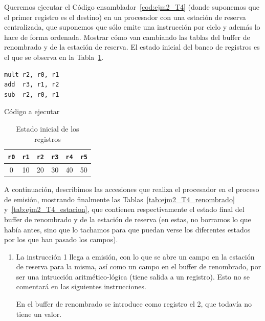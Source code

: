 \begin{ejemplo}
    Queremos ejecutar el Código ensamblador~\ref{cod:ejm2_T4} (donde suponemos que el primer registro es el destino) en un procesador con una estación de reserva centralizada, que suponemos que sólo emite una instrucción por ciclo y además lo hace de forma ordenada. Mostrar cómo van cambiando las tablas del buffer de renombrado y de la estación de reserva. El estado inicial del banco de registros es el que se observa en la Tabla~\ref{tab:ejm2_T4_registros}.\\
    \begin{listing}[H]
    \begin{verbatim}
mult r2, r0, r1        
add  r3, r1, r2
sub  r2, r0, r1
    \end{verbatim}
    \caption{Código a ejecutar}
    \label{cod:ejm2_T4}
    \end{listing}

    \begin{table}
    \centering
    \begin{tabular}{|c|c|c|c|c|c|}
        \hline
        \verb|r0| & \verb|r1| & \verb|r2| & \verb|r3| & \verb|r4| & \verb|r5| \\ 
        \hline
        0 & 10 & 20 & 30 & 40 & 50 \\
        \hline
    \end{tabular}
    \caption{Estado inicial de los registros}
    \label{tab:ejm2_T4_registros}
    \end{table}

    A continuación, describimos las accesiones que realiza el procesador en el proceso de emisión, mostrando finalmente las Tablas~\ref{tab:ejm2_T4_renombrado} y~\ref{tab:ejm2_T4_estacion}, que contienen respectivamente el estado final del buffer de renombrado y de la estación de reserva (en estas, no borramos lo que había antes, sino que lo tachamos para que puedan verse los diferentes estados por los que han pasado los campos).
    \begin{enumerate}
        \item La instrucción 1 llega a emisión, con lo que se abre un campo en la estación de reserva para la misma, así como un campo en el buffer de renombrado, por ser una intrucción aritmético-lógica (tiene salida a un registro). Esto no se comentará en las siguientes instrucciones.

            En el buffer de renombrado se introduce como registro el 2, que todavía no tiene un valor.


\end{enumerate}
\end{ejemplo}
